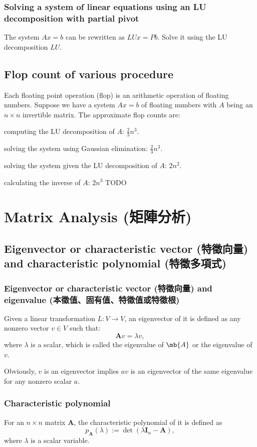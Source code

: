 \documentclass[a4paper,12pt]{report}
\begin{document}
\subsubsection{Solving a system of linear equations using an LU decomposition with partial pivot}
The system $Ax=b$ can be rewritten as $LUx=Pb$. Solve it using the LU decomposition $LU$.
\subsection{Flop count of various procedure}
Each floating point operation (flop) is an arithmetic operation of floating numbers. Suppose we have a system $Ax=b$ of floating numbers with $A$ being an $n\times n$ invertible matrix. The approximate flop counts are:
\bit
\item computing the LU decomposition of $A$: $\frac{2}{3}n^3$.
\item solving the system using Gaussian elimination: $\frac{2}{3}n^3$.
\item solving the system given the LU decomposition of $A$: $2n^2$.
\item calculating the inverse of $A$: $2n^3$
\eit
\bpr
TODO
\epr
\section{Matrix Analysis (矩陣分析)}
\subsection{Eigenvector or characteristic vector (特徵向量) and characteristic polynomial (特徵多項式)}
\subsubsection{Eigenvector or characteristic vector (特徵向量) and eigenvalue (本徵值、固有值、特徵值或特徵根)}
Given a linear transformation $L\colon V\to V$, an eigenvector of it is defined as any nonzero vector $v\in V$ such that:
\[\mathbf{A}v = \lambda v,\]
where $\lambda$ is a scalar, which is called the eigenvalue of $\mb{A}$ or the eigenvalue of $v$.

Obviously, $v$ is an eigenvector implies $av$ is an eigenvector of the same eigenvalue for any nonzero scalar $a$.
\subsubsection{Characteristic polynomial}
For an $n\times n$ matrix $\mathbf{A}$, the characteristic polynomial of it is defined as
\[p_{\mathbf{A}}(\lambda):=\det(\lambda \mathbf{I}_{n}-\mathbf{A}),\]
where $\lambda$ is a scalar variable.
\end{document}
